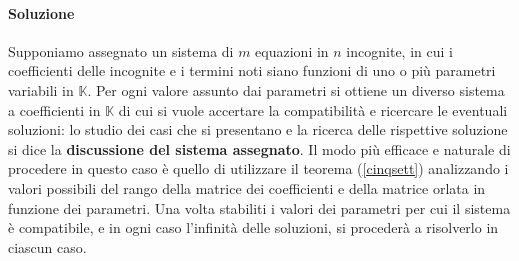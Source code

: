 \documentclass{article}
\theoremstyle{plain}
\theoremstyle{definition}
\theoremstyle{remark}
\begin{document}
\paragraph{Soluzione}
Supponiamo assegnato un sistema di $m$ equazioni in $n$ incognite, in cui i coefficienti delle incognite e i termini noti siano funzioni di uno o più parametri variabili in $\mathbb{K}$. 
Per ogni valore assunto dai parametri si ottiene un diverso sistema a coefficienti in $\mathbb{K}$ di cui si vuole accertare la compatibilità e ricercare le eventuali soluzioni: lo studio dei casi 
che si presentano e la ricerca delle rispettive soluzione si dice la \textbf{discussione del sistema assegnato}. Il modo più efficace e naturale di procedere in questo caso è quello di utilizzare 
il teorema (\ref{cinqsett}) analizzando i valori possibili del rango della matrice dei coefficienti e della matrice orlata in funzione dei parametri. Una volta stabiliti i valori dei parametri per cui il sistema è compatibile, 
e in ogni caso l'infinità delle soluzioni, si procederà a risolverlo in ciascun caso.
\end{document}
